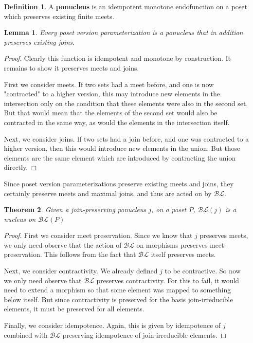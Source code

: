 \documentclass[hoptionsi,review,format=acmsmall]{acmart}
\newtheorem{theorem}{Theorem}[section]
\newtheorem{lemma}[theorem]{Lemma}
\theoremstyle{definition}
\newtheorem{definition}{Definition}[section]
\newcommand{\BLc}{\mathcal{BL}}
\begin{document}
\begin{definition}
A \textbf{ponucleus} is an idempotent monotone endofunction on a poset which preserves existing finite meets.
\end{definition}

\begin{lemma}
Every poset version parameterization is a ponucleus that in addition preserves existing joins.
\end{lemma}

\begin{proof}
Clearly this function is idempotent and monotone by construction. It remains to show it preserves meets and joins.

First we consider meets. If two sets had a meet before, and one is now "contracted" to a higher version, this may introduce new elements in the intersection only on the condition that these elements were also in the second set. But that would mean that the elements of the second set would also be contracted in the same way, as would the elements in the intersection itself.

Next, we consider joins. If two sets had a join before, and one was contracted to a higher version, then this would introduce new elements in the union. But those elements are the same element which are introduced by contracting the union directly.
\end{proof}

Since poset version parameterizations preserve existing meets and joins, they certainly preserve meets and maximal joins, and thus are acted on by \(\BLc\).

\begin{theorem}
Given a join-preserving ponucleus \(j\), on a poset \(P\),  \(\BLc(j)\) is a nucleus on \(\BLc(P)\)
\end{theorem}
\begin{proof}
First we consider meet preservation. Since we know that \(j\) preserves meets, we only need observe that the action of \(\BLc\) on morphisms preserves meet-preservation. This follows from the fact that \(\BLc\) itself preserves meets.


Next, we consider contractivity. We already defined \(j\) to be contractive. So now we only need observe that \(\BLc\) preserves contractivity. For this to fail, it would need to extend a morphism so that some element was mapped to something below itself. But since contractivity is preserved for the basis join-irreducible elements, it must be preserved for all elements.

Finally, we consider idempotence. Again, this is given by idempotence of \(j\) combined with \(\BLc\) preserving idempotence of join-irreducible elements.
\end{proof}
\end{document}
